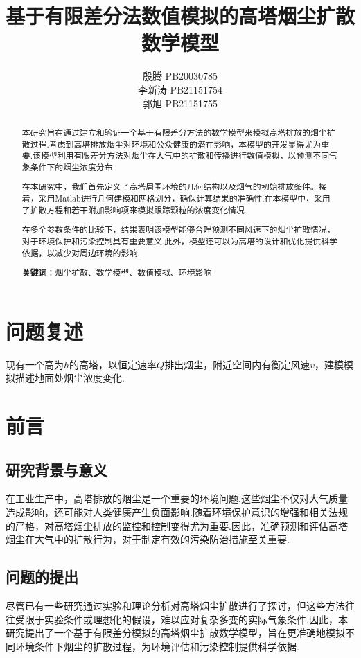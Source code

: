 \documentclass{article}
\title{\bfseries 基于有限差分法数值模拟的高塔烟尘扩散数学模型}
\author{殷腾 \quad 12 \quad PB20030785\\
	 李新涛 \quad 134 \quad PB21151754\\
	 郭旭 \quad 135 \quad PB21151755}
\begin{document}
	\maketitle
	\begin{abstract}
		本研究旨在通过建立和验证一个基于有限差分方法的数学模型来模拟高塔排放的烟尘扩散过程.考虑到高塔排放烟尘对环境和公众健康的潜在影响，本模型的开发显得尤为重要.该模型利用有限差分方法对烟尘在大气中的扩散和传播进行数值模拟，以预测不同气象条件下的烟尘浓度分布.
		
		在本研究中，我们首先定义了高塔周围环境的几何结构以及烟气的初始排放条件。接着，采用Matlab进行几何建模和网格划分，确保计算结果的准确性.在本模型中，采用了扩散方程和若干附加影响项来模拟跟踪颗粒的浓度变化情况.
		
		在多个参数条件的比较下，结果表明该模型能够合理预测不同风速下的烟尘扩散情况，对于环境保护和污染控制具有重要意义.此外，模型还可以为高塔的设计和优化提供科学依据，以减少对周边环境的影响.
		\par \textbf{关键词}：烟尘扩散、数学模型、数值模拟、环境影响
	\end{abstract}
	\setcounter{section}{-1}
	\clearpage
	\tableofcontents
	\clearpage
	
	\section{问题复述}
	现有一个高为$h$的高塔，以恒定速率$Q$排出烟尘，附近空间内有衡定风速$v$，建模模拟描述地面处烟尘浓度变化.
	
	\section{前言}
	\subsection{研究背景与意义}
	在工业生产中，高塔排放的烟尘是一个重要的环境问题.这些烟尘不仅对大气质量造成影响，还可能对人类健康产生负面影响.随着环境保护意识的增强和相关法规的严格，对高塔烟尘排放的监控和控制变得尤为重要.因此，准确预测和评估高塔烟尘在大气中的扩散行为，对于制定有效的污染防治措施至关重要.
	
	\subsection{问题的提出}
	尽管已有一些研究通过实验和理论分析对高塔烟尘扩散进行了探讨，但这些方法往往受限于实验条件或理想化的假设，难以应对复杂多变的实际气象条件.因此，本研究提出了一个基于有限差分模拟的高塔烟尘扩散数学模型，旨在更准确地模拟不同环境条件下烟尘的扩散过程，为环境评估和污染控制提供科学依据.
	
\end{document}
